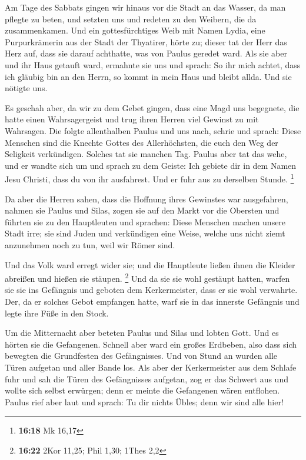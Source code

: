  Am Tage des Sabbats gingen wir hinaus vor die Stadt an
das Wasser, da man pflegte zu beten, und setzten uns und redeten zu den
Weibern, die da zusammenkamen.  Und ein gottesfürchtiges
Weib mit Namen Lydia, eine Purpurkrämerin aus der Stadt der Thyatirer,
hörte zu; dieser tat der Herr das Herz auf, dass sie darauf achthatte,
was von Paulus geredet ward.  Als sie aber und ihr Haus
getauft ward, ermahnte sie uns und sprach: So ihr mich achtet, dass ich
gläubig bin an den Herrn, so kommt in mein Haus und bleibt allda. Und
sie nötigte uns.

 Es geschah aber, da wir zu dem Gebet gingen, dass eine
Magd uns begegnete, die hatte einen Wahrsagergeist und trug ihren Herren
viel Gewinst zu mit Wahrsagen.  Die folgte allenthalben
Paulus und uns nach, schrie und sprach: Diese Menschen sind die Knechte
Gottes des Allerhöchsten, die euch den Weg der Seligkeit verkündigen.
 Solches tat sie manchen Tag. Paulus aber tat das wehe,
und er wandte sich um und sprach zu dem Geiste: Ich gebiete dir in dem
Namen Jesu Christi, dass du von ihr ausfahrest. Und er fuhr aus zu
derselben Stunde. \footnote{\textbf{16:18} Mk 16,17}

 Da aber die Herren sahen, dass die Hoffnung ihres
Gewinstes war ausgefahren, nahmen sie Paulus und Silas, zogen sie auf
den Markt vor die Obersten  und führten sie zu den
Hauptleuten und sprachen: Diese Menschen machen unsere Stadt irre; sie
sind Juden  und verkündigen eine Weise, welche uns nicht
ziemt anzunehmen noch zu tun, weil wir Römer sind.

 Und das Volk ward erregt wider sie; und die Hauptleute
ließen ihnen die Kleider abreißen und hießen sie stäupen. \footnote{\textbf{16:22}
  2Kor 11,25; Phil 1,30; 1Thes 2,2}  Und da sie sie wohl
gestäupt hatten, warfen sie sie ins Gefängnis und geboten dem
Kerkermeister, dass er sie wohl verwahrte.  Der, da er
solches Gebot empfangen hatte, warf sie in das innerste Gefängnis und
legte ihre Füße in den Stock.

 Um die Mitternacht aber beteten Paulus und Silas und
lobten Gott. Und es hörten sie die Gefangenen.  Schnell
aber ward ein großes Erdbeben, also dass sich bewegten die Grundfesten
des Gefängnisses. Und von Stund an wurden alle Türen aufgetan und aller
Bande los.  Als aber der Kerkermeister aus dem Schlafe
fuhr und sah die Türen des Gefängnisses aufgetan, zog er das Schwert aus
und wollte sich selbst erwürgen; denn er meinte die Gefangenen wären
entflohen.  Paulus rief aber laut und sprach: Tu dir
nichts Übles; denn wir sind alle hier!

